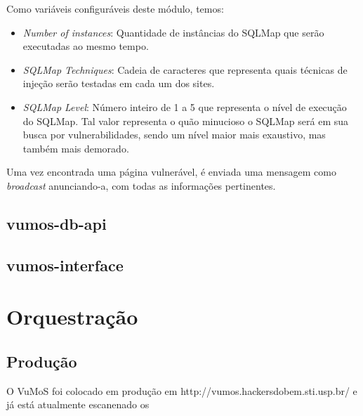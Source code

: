     Como variáveis configuráveis deste módulo, temos:
    \begin{itemize}
        \item \emph{Number of instances}: Quantidade de instâncias do SQLMap que serão executadas ao mesmo tempo.
        \item \emph{SQLMap Techniques}: Cadeia de caracteres que representa quais técnicas de injeção serão testadas em cada um dos sites.
        \item \emph{SQLMap Level}: Número inteiro de 1 a 5 que representa o nível de execução do SQLMap. Tal valor representa o quão minucioso o SQLMap será em sua busca por vulnerabilidades, sendo um nível maior mais exaustivo, mas também mais demorado.
    \end{itemize}
    
    Uma vez encontrada uma página vulnerável, é enviada uma mensagem como \textit{broadcast} anunciando-a, com todas as informações pertinentes.


    \subsection{vumos-db-api}
    \subsection{vumos-interface}
    

\section{Orquestração}
    
    \subsection{Produção}
    O VuMoS foi colocado em produção em http://vumos.hackersdobem.sti.usp.br/ e já está atualmente escanenado os  

